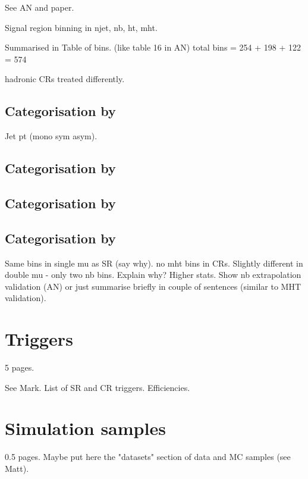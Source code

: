See AN and paper.

Signal region binning in njet, nb, ht, mht. 

Summarised in
Table of bins. (like table 16 in AN)
total bins = 254 + 198 + 122 = 574

hadronic CRs treated differently.

\subsection{Categorisation by \njet}

Jet pt (mono sym asym).

\subsection{Categorisation by \scalht}

\subsection{Categorisation by \nb}

\subsection{Categorisation by \mht}

Same bins in single mu as SR (say why).
no mht bins in CRs.
Slightly different in double mu - only two nb bins. Explain why? Higher stats. 
Show nb extrapolation validation (AN) or just summarise briefly in couple of 
sentences (similar to MHT validation).



\section{Triggers}
\label{sec:analysis-trigger}
5 pages.

See Mark.
List of SR and CR triggers.
Efficiencies.

\section{Simulation samples}
0.5 pages.
Maybe put here the "datasets" section of data and MC samples (see Matt).

